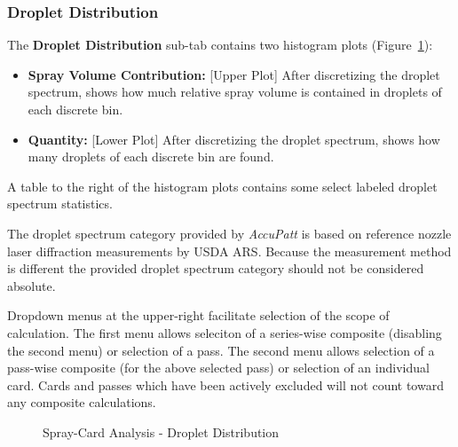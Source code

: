 \documentclass[10pt,letterpaper,titlepage]{article}
\begin{document}
    \subsubsection{Droplet Distribution}
    The \textbf{Droplet Distribution} sub-tab contains two histogram plots (Figure~\ref{fig:card_droplet_dist}):
    \begin{itemize}
        \item \textbf{Spray Volume Contribution:} [Upper Plot] After discretizing the droplet spectrum, shows how much relative spray volume is contained in droplets of each discrete bin.
        \item \textbf{Quantity:} [Lower Plot] After discretizing the droplet spectrum, shows how many droplets of each discrete bin are found.
    \end{itemize}
    A table to the right of the histogram plots contains some select labeled droplet spectrum statistics.\par
    \color{red} The droplet spectrum category provided by \textit{AccuPatt} is based on reference nozzle laser diffraction measurements by USDA ARS. Because the measurement method is different the provided droplet spectrum category should not be considered absolute.\color{black}\par
    Dropdown menus at the upper-right facilitate selection of the scope of calculation. The first menu allows seleciton of a series-wise composite (disabling the second menu) or selection of a pass. The second menu allows selection of a pass-wise composite (for the above selected pass) or selection of an individual card. Cards and passes which have been actively excluded will not count toward any composite calculations.
    \begin{figure}[hb]
        \centering
        \caption{Spray-Card Analysis - Droplet Distribution}
        \label{fig:card_droplet_dist}
    \end{figure}
    \FloatBarrier
    \newpage
\end{document}
